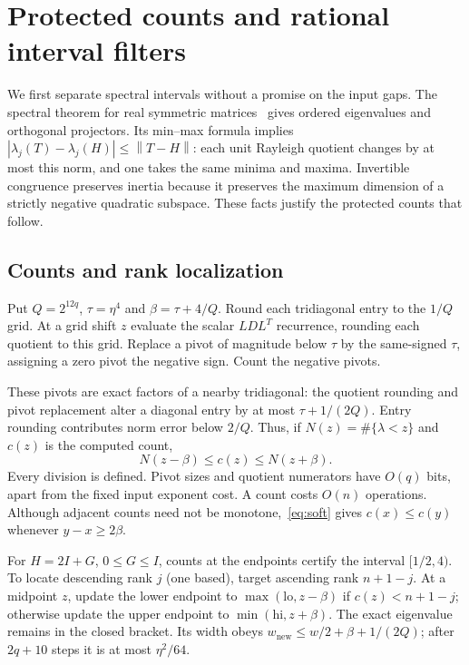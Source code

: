 \documentclass[11pt]{article}
\theoremstyle{remark}\newtheorem{remark}[theorem]{Remark}
\newcommand{\norm}[1]{\left\lVert#1\right\rVert}
\newcommand{\abs}[1]{\left\lvert#1\right\rvert}
\begin{document}
\section{Protected counts and rational interval filters}\label{sec:counts}
We first separate spectral intervals without a promise on the input gaps.
The spectral theorem for real symmetric matrices~\cite[Theorem 7.29]{Axler}
gives ordered eigenvalues and orthogonal projectors. Its min--max formula
implies $\abs{\lambda_j(T)-\lambda_j(H)}\le\norm{T-H}$: each unit Rayleigh
quotient changes by at most this norm, and one takes the same minima and
maxima. Invertible congruence preserves inertia because it preserves the
maximum dimension of a strictly negative quadratic subspace. These facts
justify the protected counts that follow.

\subsection{Counts and rank localization}
Put $Q=2^{12q}$, $\tau=\eta^4$ and $\beta=\tau+4/Q$. Round each
tridiagonal entry to the $1/Q$ grid. At a grid shift $z$ evaluate the scalar
$LDL^T$ recurrence, rounding each quotient to this grid. Replace a pivot of
magnitude below $\tau$ by the same-signed $\tau$, assigning a zero pivot
the negative sign. Count the negative pivots.

These pivots are exact factors of a nearby tridiagonal: the quotient rounding
and pivot replacement alter a diagonal entry by at most $\tau+1/(2Q)$.
Entry rounding contributes norm error below $2/Q$. Thus, if
$N(z)=\#\{\lambda<z\}$ and $c(z)$ is the computed count,
\begin{equation}\label{eq:soft}
 N(z-\beta)\le c(z)\le N(z+\beta).
\end{equation}
Every division is defined. Pivot sizes and quotient numerators have $O(q)$
bits, apart from the fixed input exponent cost. A count costs $O(n)$
operations. Although adjacent counts need not be monotone,~\eqref{eq:soft}
gives $c(x)\le c(y)$ whenever $y-x\ge2\beta$.

For $H=2I+G$, $0\le G\le I$, counts at the endpoints certify the interval
$[1/2,4)$. To locate descending rank $j$ (one based), target ascending rank
$n+1-j$. At a midpoint $z$, update the lower endpoint to
$\max(\mathrm{lo},z-\beta)$ if $c(z)<n+1-j$; otherwise update the upper
endpoint to $\min(\mathrm{hi},z+\beta)$. The exact eigenvalue remains in the
closed bracket. Its width obeys $w_{\mathrm{new}}\le w/2+\beta+1/(2Q)$;
after $2q+10$ steps it is at most $\eta^2/64$.
\end{document}
